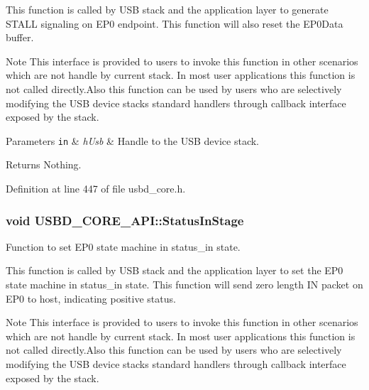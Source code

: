 This function is called by U\+SB stack and the application layer to generate S\+T\+A\+LL signaling on E\+P0 endpoint. This function will also reset the E\+P0\+Data buffer. ~\newline
\begin{DoxyNote}{Note}
This interface is provided to users to invoke this function in other scenarios which are not handle by current stack. In most user applications this function is not called directly.\+Also this function can be used by users who are selectively modifying the U\+SB device stack\textquotesingle{}s standard handlers through callback interface exposed by the stack.
\end{DoxyNote}

\begin{DoxyParams}[1]{Parameters}
\mbox{\tt in}  & {\em h\+Usb} & Handle to the U\+SB device stack. \\
\hline
\end{DoxyParams}
\begin{DoxyReturn}{Returns}
Nothing. 
\end{DoxyReturn}


Definition at line 447 of file usbd\+\_\+core.\+h.

\subsubsection[{\texorpdfstring{Status\+In\+Stage}{StatusInStage}}]{\setlength{\rightskip}{0pt plus 5cm}void U\+S\+B\+D\+\_\+\+C\+O\+R\+E\+\_\+\+A\+P\+I\+::\+Status\+In\+Stage}\hypertarget{structUSBD__CORE__API_a9b57a8360ef4b3acd63ede5773813b36}{}\label{structUSBD__CORE__API_a9b57a8360ef4b3acd63ede5773813b36}
Function to set E\+P0 state machine in status\+\_\+in state.

This function is called by U\+SB stack and the application layer to set the E\+P0 state machine in status\+\_\+in state. This function will send zero length IN packet on E\+P0 to host, indicating positive status. ~\newline
\begin{DoxyNote}{Note}
This interface is provided to users to invoke this function in other scenarios which are not handle by current stack. In most user applications this function is not called directly.\+Also this function can be used by users who are selectively modifying the U\+SB device stack\textquotesingle{}s standard handlers through callback interface exposed by the stack.
\end{DoxyNote}

